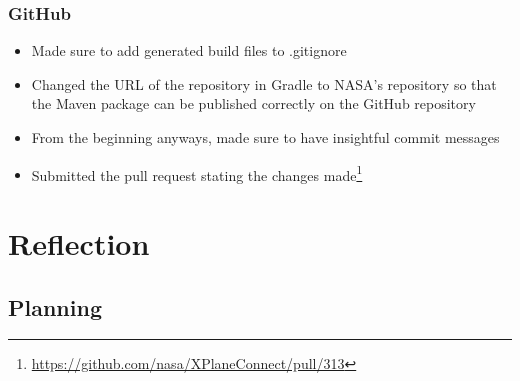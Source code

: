 \documentclass[../dissertation.tex]{subfiles}
\begin{document}
\subsubsection{GitHub}
\begin{itemize}
  \item Made sure to add generated build files to .gitignore
  \item Changed the URL of the repository in Gradle to NASA's repository so that
    the Maven package can be published correctly on the GitHub repository
  \item From the beginning anyways, made sure to have insightful commit messages
  \item Submitted the pull request stating the changes made\footnote{\url{https://github.com/nasa/XPlaneConnect/pull/313}}
\end{itemize}


\section{Reflection}
\subsection{Planning}


\end{document}
